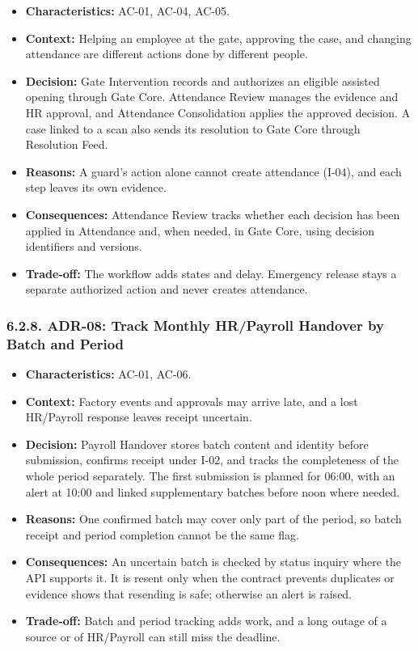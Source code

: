 \begin{itemize}[leftmargin=36pt, itemsep=2pt, topsep=4pt, parsep=2pt]
  \item \textbf{Characteristics:} AC-01, AC-04, AC-05.
  \item \textbf{Context:} Helping an employee at the gate, approving the case, and changing attendance are different actions done by different people.
  \item \textbf{Decision:} Gate Intervention records and authorizes an eligible assisted opening through Gate Core. Attendance Review manages the evidence and HR approval, and Attendance Consolidation applies the approved decision. A case linked to a scan also sends its resolution to Gate Core through Resolution Feed.
  \item \textbf{Reasons:} A guard's action alone cannot create attendance (I-04), and each step leaves its own evidence.
  \item \textbf{Consequences:} Attendance Review tracks whether each decision has been applied in Attendance and, when needed, in Gate Core, using decision identifiers and versions.
  \item \textbf{Trade-off:} The workflow adds states and delay. Emergency release stays a separate authorized action and never creates attendance.
\end{itemize}

\subsubsection*{6.2.8. ADR-08: Track Monthly HR/Payroll Handover by Batch and Period}

{}

\begin{itemize}[leftmargin=36pt, itemsep=2pt, topsep=4pt, parsep=2pt]
  \item \textbf{Characteristics:} AC-01, AC-06.
  \item \textbf{Context:} Factory events and approvals may arrive late, and a lost HR/Payroll response leaves receipt uncertain.
  \item \textbf{Decision:} Payroll Handover stores batch content and identity before submission, confirms receipt under I-02, and tracks the completeness of the whole period separately. The first submission is planned for 06:00, with an alert at 10:00 and linked supplementary batches before noon where needed.
  \item \textbf{Reasons:} One confirmed batch may cover only part of the period, so batch receipt and period completion cannot be the same flag.
  \item \textbf{Consequences:} An uncertain batch is checked by status inquiry where the API supports it. It is resent only when the contract prevents duplicates or evidence shows that resending is safe; otherwise an alert is raised.
  \item \textbf{Trade-off:} Batch and period tracking adds work, and a long outage of a source or of HR/Payroll can still miss the deadline.
\end{itemize}

